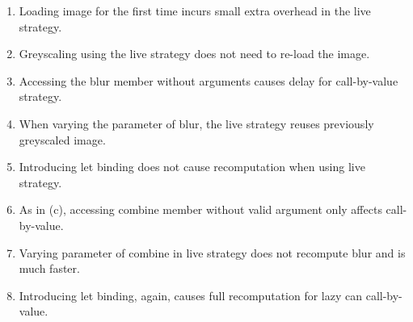 \documentclass[english,submission]{programming}
\theoremstyle{plain}
\theoremstyle{definition}
\begin{document}
\begin{enumerate}
\item Loading image for the first time incurs small extra overhead in the live strategy.
\item Greyscaling using the live strategy does not need to re-load the image.
\item Accessing the blur member without arguments causes delay for call-by-value strategy.
\item When varying the parameter of blur, the live strategy reuses previously greyscaled image.
\item Introducing let binding does not cause recomputation when using live strategy.
\item As in (c), accessing combine member without valid argument only affects call-by-value.
\item Varying parameter of combine in live strategy does not recompute blur and is much faster.
\item Introducing let binding, again, causes full recomputation for lazy can call-by-value.
\end{enumerate}

\end{document}
